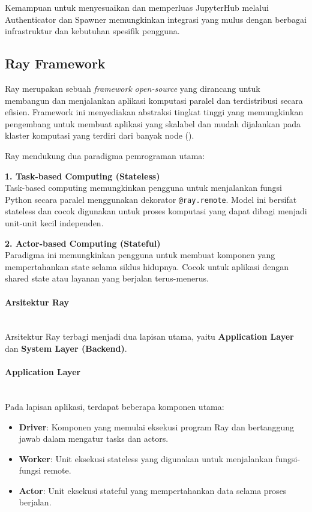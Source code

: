 Kemampuan untuk menyesuaikan dan memperluas JupyterHub melalui Authenticator dan Spawner memungkinkan integrasi yang mulus dengan berbagai infrastruktur dan kebutuhan spesifik pengguna.

\subsection{Ray Framework}

Ray merupakan sebuah \textit{framework} \textit{open-source} yang dirancang untuk membangun dan menjalankan aplikasi komputasi paralel dan terdistribusi secara efisien. Framework ini menyediakan abstraksi tingkat tinggi yang memungkinkan pengembang untuk membuat aplikasi yang skalabel dan mudah dijalankan pada klaster komputasi yang terdiri dari banyak node (\cite{moritz2018ray}).

Ray mendukung dua paradigma pemrograman utama:

\textbf{1. Task-based Computing (Stateless)}\\
Task-based computing memungkinkan pengguna untuk menjalankan fungsi Python secara paralel menggunakan dekorator \texttt{@ray.remote}. Model ini bersifat stateless dan cocok digunakan untuk proses komputasi yang dapat dibagi menjadi unit-unit kecil independen.

\textbf{2. Actor-based Computing (Stateful)}\\
Paradigma ini memungkinkan pengguna untuk membuat komponen yang mempertahankan state selama siklus hidupnya. Cocok untuk aplikasi dengan shared state atau layanan yang berjalan terus-menerus.

\paragraph{Arsitektur Ray}\mbox{}\\
Arsitektur Ray terbagi menjadi dua lapisan utama, yaitu \textbf{Application Layer} dan \textbf{System Layer (Backend)}.

\paragraph{Application Layer}\mbox{}\\
Pada lapisan aplikasi, terdapat beberapa komponen utama:

\begin{itemize}
\item \textbf{Driver}: Komponen yang memulai eksekusi program Ray dan bertanggung jawab dalam mengatur tasks dan actors.
\item \textbf{Worker}: Unit eksekusi stateless yang digunakan untuk menjalankan fungsi-fungsi remote.
\item \textbf{Actor}: Unit eksekusi stateful yang mempertahankan data selama proses berjalan.
\end{itemize}

